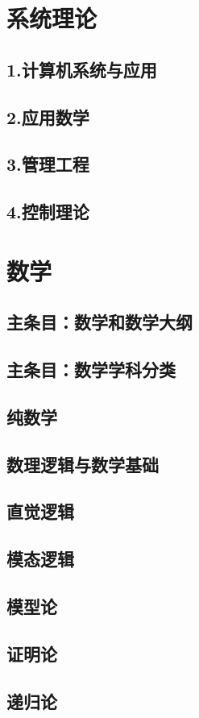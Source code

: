 \documentclass[UTF8]{NatureUniverse}
\begin{document}
\chapter{系统理论}
\section{1.计算机系统与应用}
\section{2.应用数学}
\section{3.管理工程}
\section{4.控制理论}


\chapter{数学}
\section{主条目：数学和数学大纲}
\section{主条目：数学学科分类}
\section{纯数学}
\section{数理逻辑与数学基础}
\section{直觉逻辑}
\section{模态逻辑}
\section{模型论}
\section{证明论}
\section{递归论}
\end{document}
